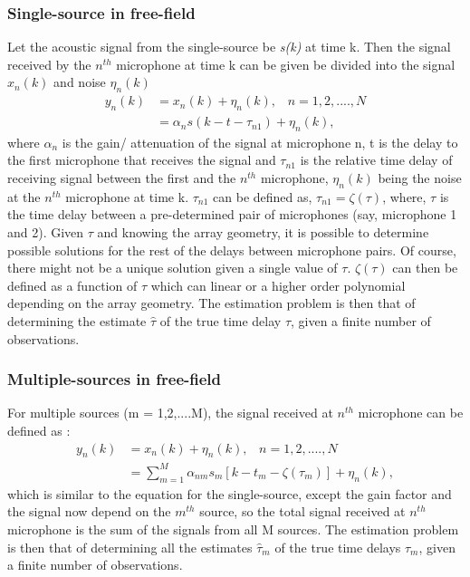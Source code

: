 \subsubsection{Single-source in free-field}
Let the acoustic signal from the single-source be \textit{s(k)} at time k. Then the signal received by the $n^{th}$ microphone at time k can be given be divided into the signal $x_n(k)$ and noise $\eta_n(k)$
\begin{equation}
    \begin{split}
    y_n(k) &= x_n(k) + \eta_n(k),\hspace{10pt} n = 1,2,....,N\\ 
           &=\alpha_n s(k-t-\tau_{n1}) + \eta_n(k),
    \end{split}
\end{equation}
where $\alpha_n$ is the gain/ attenuation of the signal at microphone n, t is the delay to the first microphone that receives the signal and $\tau_{n1}$ is the relative time delay of receiving signal between the first and the $n^{th}$ microphone, $\eta_n(k)$ being the noise at the $n^{th}$ microphone at time k. $\tau_{n1}$ can be defined as, $\tau_{n1}=\zeta(\tau)$, where, $\tau$ is the time delay between a pre-determined pair of microphones (say, microphone 1 and 2). Given $\tau$ and knowing the array geometry, it is possible to determine possible solutions for the rest of the delays between microphone pairs. Of course, there might not be a unique solution given a single value of $\tau$. $\zeta(\tau)$ can then be defined as a function of $\tau$ which can linear or a higher order polynomial depending on the array geometry. The estimation problem is then that of determining the estimate $\hat{\tau}$ of the true time delay $\tau$, given a finite number of observations.

\subsubsection{Multiple-sources in free-field}

For multiple sources (m = 1,2,....M), the signal received at $n^{th}$ microphone can be defined as : 
\begin{equation}
    \begin{split}
         y_n(k) &= x_n(k) + \eta_n(k),\hspace{10pt} n = 1,2,....,N \\
                &= \sum\limits_{m=1}^M \alpha_{nm}s_m[k - t_m - \zeta({\tau_m})] + \eta_n(k),
    \end{split}
\end{equation}
which is similar to the equation for the single-source, except the gain factor and the signal now depend on the $m^{th}$ source, so the total signal received at $n^{th}$ microphone is the sum of the signals from all M sources. The estimation problem is then that of determining all the estimates $\hat{\tau}_m$ of the true time delays $\tau_m$, given a finite number of observations.

